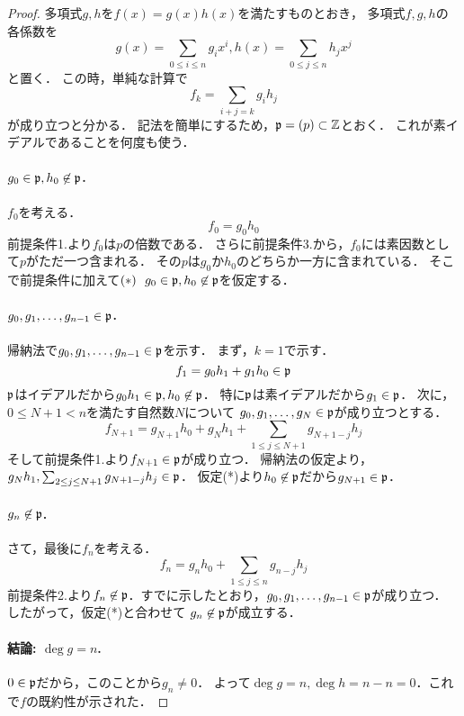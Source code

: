 \documentclass[lualatex, ja=standard, a4paper]{bxjsarticle}
\begin{document}
\begin{proof}
    多項式$g,h$を$f(x)=g(x) h(x)$を満たすものとおき，
    多項式$f, g, h$の各係数を
    \[ g(x)=\sum_{0 \leq i \leq n}{g_i x^i}, h(x)=\sum_{0 \leq j \leq n}{h_j x^j} \]
    と置く．
    この時，単純な計算で
    \[ f_{k}=\sum_{i+j=k}{g_i h_j} \]
    が成り立つと分かる．
    記法を簡単にするため，$\mathfrak{p}=(p) \subset \mathbb{Z}$とおく．
    これが素イデアルであることを何度も使う．

    \paragraph{$g_0 \in \mathfrak{p}, h_0 \not \in \mathfrak{p}$.}
    $f_0$を考える．
    \[ f_0=g_0 h_0 \]
    前提条件1.より$f_0$は$p$の倍数である．
    さらに前提条件3.から，$f_0$には素因数として$p$がただ一つ含まれる．
    その$p$は$g_0$か$h_0$のどちらか一方に含まれている．
    そこで前提条件に加えて$(*)~~g_0 \in \mathfrak{p}, h_0 \not \in \mathfrak{p}$を仮定する．

    \paragraph{$g_0, g_1, \dots, g_{n-1} \in \mathfrak{p}$.}
    帰納法で$g_0, g_1, \dots, g_{n-1} \in \mathfrak{p}$を示す．
    まず，$k=1$で示す．
    \[ f_1=g_0 h_1 + g_1 h_0 \in \mathfrak{p} \]
    $\mathfrak{p}$はイデアルだから$g_0 h_1 \in \mathfrak{p}, h_0 \not \in \mathfrak{p}$．
    特に$\mathfrak{p}$は素イデアルだから$g_1 \in \mathfrak{p}$．
    次に，$0 \leq N+1 < n$を満たす自然数$N$について
    $g_0, g_1, \dots, g_{N} \in \mathfrak{p}$が成り立つとする．
    \[ f_{N+1}=g_{N+1} h_0+g_{N} h_1+\sum_{1 \leq j \leq N+1}{g_{N+1-j} h_j } \]
    そして前提条件1.より$f_{N+1} \in \mathfrak{p}$が成り立つ．
    帰納法の仮定より，$g_{N} h_1, \sum_{2 \leq j \leq N+1}{g_{N+1-j} h_j } \in \mathfrak{p}$．
    仮定(*)より$h_0 \not \in \mathfrak{p}$だから$g_{N+1} \in \mathfrak{p}$．

    \paragraph{$g_n \not \in \mathfrak{p}$.}
    さて，最後に$f_n$を考える．
    \[ f_{n}=g_{n} h_0+\sum_{1 \leq j \leq n}{g_{n-j} h_j } \]
    前提条件2.より$f_{n} \not \in \mathfrak{p}$．すでに示したとおり，$g_0, g_1, \dots, g_{n-1} \in \mathfrak{p}$が成り立つ．
    したがって，仮定(*)と合わせて
    $g_n \not \in \mathfrak{p}$が成立する．

    \paragraph{結論: $\deg g=n$.}
    $0 \in \mathfrak{p}$だから，このことから$g_n \neq 0$．
    よって$\deg g=n, \deg h=n-n=0$．これで$f$の既約性が示された．
\end{proof}
\end{document}
